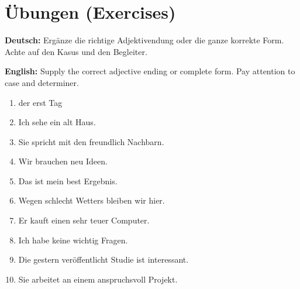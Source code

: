 \documentclass[a4paper,11pt]{article}
\newcommand{\GermanText}[1]{\textbf{Deutsch: }#1\par}
\newcommand{\EnglishText}[1]{{\small\color{SoftGray}\textbf{English: }#1\par}}
\begin{document}
\section{Übungen \textnormal{(Exercises)}}
\GermanText{Ergänze die richtige Adjektivendung oder die ganze korrekte Form. Achte auf den Kasus und den Begleiter.}
\EnglishText{Supply the correct adjective ending or complete form. Pay attention to case and determiner.}
\begin{enumerate}
\item der erst\underline{\hspace{1.0cm}} Tag
\item Ich sehe ein alt\underline{\hspace{1.0cm}} Haus.
\item Sie spricht mit den freundlich\underline{\hspace{1.0cm}} Nachbarn.
\item Wir brauchen neu\underline{\hspace{1.0cm}} Ideen.
\item Das ist mein best\underline{\hspace{1.0cm}} Ergebnis.
\item Wegen schlecht\underline{\hspace{1.0cm}} Wetters bleiben wir hier.
\item Er kauft einen sehr teuer\underline{\hspace{1.0cm}} Computer.
\item Ich habe keine wichtig\underline{\hspace{1.0cm}} Fragen.
\item Die gestern veröffentlicht\underline{\hspace{1.0cm}} Studie ist interessant.
\item Sie arbeitet an einem anspruchsvoll\underline{\hspace{1.0cm}} Projekt.
\end{enumerate}
\end{document}
